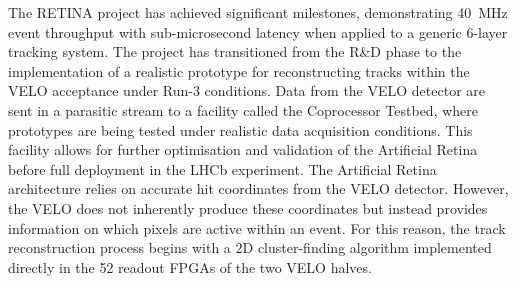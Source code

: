 The RETINA project has achieved significant milestones, demonstrating \SI{40}{\mega\hertz} event throughput with sub-microsecond latency when applied to a generic 6-layer tracking system\cite{Abba_2015}. The project has transitioned from the R\&D phase to the implementation of a realistic prototype for reconstructing tracks within the VELO acceptance under Run-3 conditions. Data from the VELO detector are sent in a parasitic stream to a facility called the Coprocessor Testbed, where  prototypes are being tested under realistic data acquisition conditions. This facility allows for further optimisation and validation of the Artificial Retina before full deployment in the LHCb experiment.
The Artificial Retina architecture relies on accurate hit coordinates from the VELO detector. However, the VELO does not inherently produce these coordinates but instead provides information on which pixels are active within an event. For this reason, the track reconstruction process begins with a $2$D cluster-finding algorithm implemented directly in the 52 readout FPGAs of the two VELO halves.






